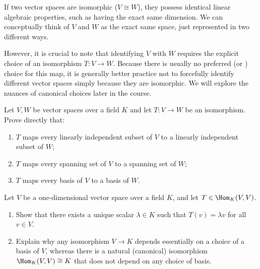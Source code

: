 \begin{remark}
\label{rem:significance_of_iso}
If two vector spaces are isomorphic ($V \cong W$), they possess identical linear algebraic properties, such as having the exact same dimension. We can conceptually think of $V$ and $W$ as the exact same space, just represented in two different ways. 

However, it is crucial to note that identifying $V$ with $W$ requires the explicit choice of an isomorphism $T: V \to W$. Because there is usually no preferred (or ) choice for this map, it is generally better practice not to forcefully identify different vector spaces simply because they are isomorphic. We will explore the nuances of canonical choices later in the course.
\end{remark}

\begin{exercise}
\label{exc:isomorphisms_preserve_structures}
Let $V, W$ be vector spaces over a field $K$ and let $T \colon V \to W$ be an isomorphism. Prove directly that:
\begin{enumerate}
    \item $T$ maps every linearly independent subset of $V$ to a linearly independent subset of $W$;
    \item $T$ maps every spanning set of $V$ to a spanning set of $W$;
    \item $T$ maps every basis of $V$ to a basis of $W$.
\end{enumerate}
\end{exercise}

\begin{exercise}
\label{exc:one_dim_endomorphism_canonical_iso}
Let $V$ be a one-dimensional vector space over a field $K$, and let $T \in \Hom_K(V, V)$.
\begin{enumerate}
    \item Show that there exists a unique scalar $\lambda \in K$ such that $T(v) = \lambda v$ for all $v \in V$.
    \item Explain why any isomorphism $V \to K$ depends essentially on a choice of a basis of $V$, whereas there is a natural (canonical) isomorphism $\Hom_K(V, V) \cong K$ that does not depend on any choice of basis.
\end{enumerate}
\end{exercise}

